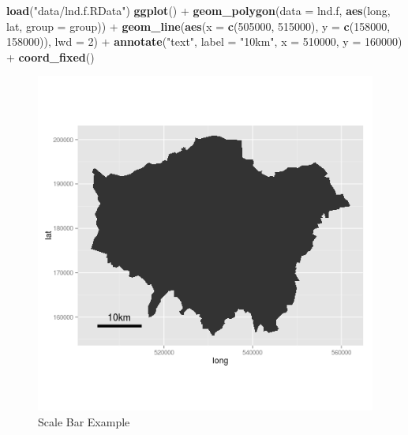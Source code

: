 \documentclass[]{article}
\newenvironment{Shaded}{}{}
\newcommand{\KeywordTok}[1]{\textcolor[rgb]{0.00,0.44,0.13}{\textbf{{#1}}}}
\newcommand{\DataTypeTok}[1]{\textcolor[rgb]{0.56,0.13,0.00}{{#1}}}
\newcommand{\DecValTok}[1]{\textcolor[rgb]{0.25,0.63,0.44}{{#1}}}
\newcommand{\StringTok}[1]{\textcolor[rgb]{0.25,0.44,0.63}{{#1}}}
\newcommand{\NormalTok}[1]{{#1}}
\begin{document}
\begin{Shaded}
\begin{Highlighting}[]
\KeywordTok{load}\NormalTok{(}\StringTok{"data/lnd.f.RData"}\NormalTok{)}
\KeywordTok{ggplot}\NormalTok{() +}\StringTok{ }\KeywordTok{geom_polygon}\NormalTok{(}\DataTypeTok{data =} \NormalTok{lnd.f, }\KeywordTok{aes}\NormalTok{(long, lat, }\DataTypeTok{group =} \NormalTok{group)) +}\StringTok{ }\KeywordTok{geom_line}\NormalTok{(}\KeywordTok{aes}\NormalTok{(}\DataTypeTok{x =} \KeywordTok{c}\NormalTok{(}\DecValTok{505000}\NormalTok{, }
    \DecValTok{515000}\NormalTok{), }\DataTypeTok{y =} \KeywordTok{c}\NormalTok{(}\DecValTok{158000}\NormalTok{, }\DecValTok{158000}\NormalTok{)), }\DataTypeTok{lwd =} \DecValTok{2}\NormalTok{) +}\StringTok{ }\KeywordTok{annotate}\NormalTok{(}\StringTok{"text"}\NormalTok{, }\DataTypeTok{label =} \StringTok{"10km"}\NormalTok{, }
    \DataTypeTok{x =} \DecValTok{510000}\NormalTok{, }\DataTypeTok{y =} \DecValTok{160000}\NormalTok{) +}\StringTok{ }\KeywordTok{coord_fixed}\NormalTok{()}
\end{Highlighting}
\end{Shaded}

\begin{figure}[htbp]
\centering
\includegraphics{figure/Scale_Bar_Example.png}
\caption{Scale Bar Example}
\end{figure}
\end{document}
